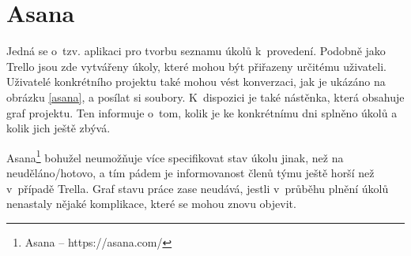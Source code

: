 \section{Asana}

Jedná se o~tzv. aplikaci pro tvorbu seznamu úkolů k~provedení. Podobně jako Trello jsou zde vytvářeny úkoly, které mohou být přiřazeny určitému uživateli. Uživatelé konkrétního projektu také mohou vést konverzaci, jak je ukázáno na obrázku \ref{asana}, a posílat si soubory. K~dispozici je také nástěnka, která obsahuje graf projektu. Ten informuje o~tom, kolik je ke konkrétnímu dni splněno úkolů a kolik jich ještě zbývá.

Asana\footnote{Asana -- https://asana.com/} bohužel neumožňuje více specifikovat stav úkolu jinak, než na neuděláno/hotovo, a tím pádem je informovanost členů týmu ještě horší než v~případě Trella. Graf stavu práce zase neudává, jestli v~průběhu plnění úkolů nenastaly nějaké komplikace, které se mohou znovu objevit.

